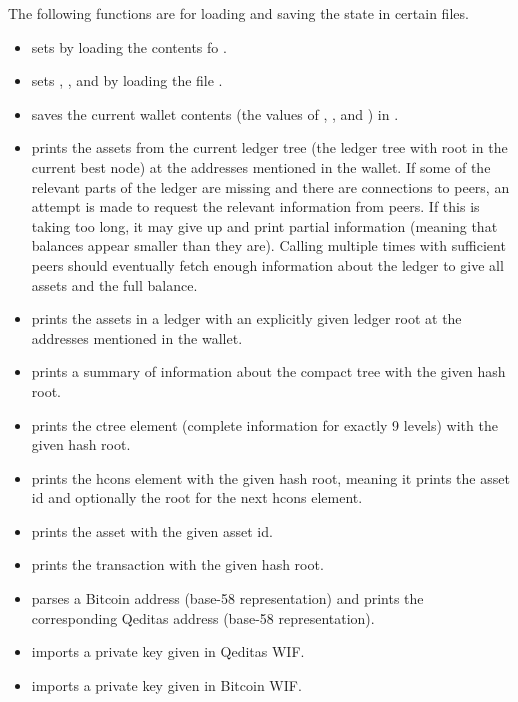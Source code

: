 The following functions are for loading and saving the state in certain files.
\begin{itemize}
\item {} sets {} by loading the contents fo {}.
\item {} sets {}, {},
{}
and {}
by loading the file {}.
\item {} saves the current wallet contents
(the values of {}, {},
{}
and {})
in {}.
\item {} prints the assets from the current ledger tree (the ledger tree with root in the current best node) at the addresses
mentioned in the wallet.
If some of the relevant parts of the ledger are missing and there are connections to peers, an attempt is made to request
the relevant information from peers. If this is taking too long, it may give up and print partial information
(meaning that balances appear smaller than they are).
Calling {} multiple times with sufficient peers should eventually fetch enough information about the
ledger to give all assets and the full balance.
\item {} prints the assets in a ledger with an explicitly given ledger root
at the addresses mentioned in the wallet.
\item {} prints a summary of information about the compact tree with the given hash root.
\item {} prints the ctree element (complete information for exactly 9 levels) with the given hash root.
\item {} prints the hcons element with the given hash root, meaning it prints the asset id and optionally the root for the next hcons element.
\item {} prints the asset with the given asset id.
\item {} prints the transaction with the given hash root.
\item {} parses a Bitcoin address (base-58 representation) and prints the corresponding Qeditas address (base-58 representation).
\item {} imports a private key given in Qeditas WIF.
\item {} imports a private key given in Bitcoin WIF.

\end{itemize}

